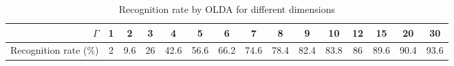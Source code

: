\begin{table}[htbp]
\centering
\caption{Recognition rate by OLDA for different dimensions}
\tabcolsep=0.11cm
\begin{tabular}{|r|c|c|c|c|c|c|c|c|c|c|c|c|c|c|}
\hline
$\Gamma$  & 1     & 2     & 3     & 4     & 5     & 6     & 7     & 8     & 9     & 10    & 12    & 15    & 20    & 30 \\
\hline
Recognition rate (\%) & {2} & {9.6} & {26} & {42.6} & {56.6} & {66.2} & {74.6} & {78.4} & {82.4} & {83.8} & {86} & {89.6} & {90.4} & {93.6} \\
\hline
\end{tabular}%
\label{tab:experiment:gamma}%
\end{table}%
